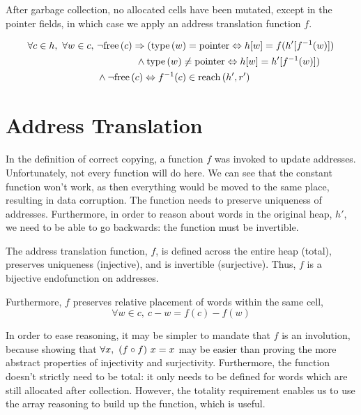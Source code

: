 \begin{definition}
  \label{def:c-correct-copying}
  After garbage collection, no allocated cells have been mutated,
  except in the pointer fields, in which case we apply an address
  translation function $f$.

  \begin{align*}
    \forall c \in h,\ \forall w \in c,\ &\lnot\mathrm{free}\left(c\right) \Rightarrow
    (\mathrm{type}\left(w\right) = \mathrm{pointer} \Leftrightarrow h[w] = f(h'[f^{-1}(w)])\\
    &\quad\quad\quad\quad \land \mathrm{type}\left(w\right) \neq \mathrm{pointer}
    \Leftrightarrow h[w] = h'[f^{-1}(w)])\\
    &\land \lnot\mathrm{free}\left(c\right) \Leftrightarrow f^{-1}(c) \in \mathrm{reach}\left(h', r'\right)
  \end{align*}
\end{definition}

\section{Address Translation}
\label{sec:copying-address}

In the definition of correct copying, a function $f$ was invoked to
update addresses. Unfortunately, not every function will do here. We
can see that the constant function won't work, as then everything
would be moved to the same place, resulting in data corruption. The
function needs to preserve uniqueness of addresses. Furthermore, in
order to reason about words in the original heap, $h'$, we need to be
able to go backwards: the function must be invertible.

\begin{definition}
  \label{def:c-address-translation-function}
  The address translation function, $f$, is defined across the entire
  heap (total), preserves uniqueness (injective), and is invertible
  (surjective). Thus, $f$ is a bijective endofunction on addresses.

  Furthermore, $f$ preserves relative placement of words within the
  same cell, \[\forall w \in c,\ c - w = f(c) - f(w)\]
\end{definition}

In order to ease reasoning, it may be simpler to mandate that $f$ is
an involution, because showing that $\forall x,\ (f \circ f)~x = x$ may
be easier than proving the more abstract properties of injectivity and
surjectivity. Furthermore, the function doesn't strictly need to be
total: it only needs to be defined for words which are still allocated
after collection. However, the totality requirement enables us to use
the array reasoning to build up the function, which is useful.

